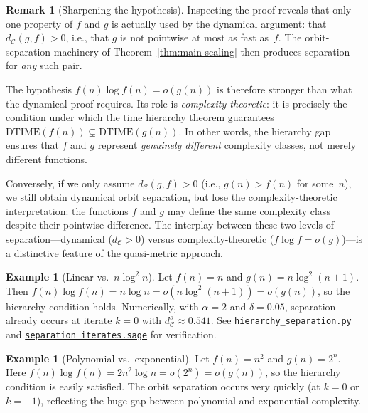 \documentclass[11pt,a4paper]{article}
\newcommand{\repourl}{https://github.com/guydev42/expansive-homeomorphisms-complexity-qmetric}
\theoremstyle{plain}
\theoremstyle{definition}
\newtheorem{exampleinner}[theoreminner]{Example}
\newtheorem{remarkinner}[theoreminner]{Remark}
\newenvironment{example}[1][]{\begin{exampleinner}[#1]}{\end{exampleinner}}
\newenvironment{remark}[1][]{\begin{remarkinner}[#1]}{\end{remarkinner}}
\newcommand{\C}{\mathcal{C}}
\begin{document}
\begin{remark}[Sharpening the hypothesis]\label{rem:hierarchy-sharp}
Inspecting the proof reveals that only one property of $f$ and $g$
is actually used by the dynamical argument: that $d_\C(g,f)>0$,
i.e., that $g$ is not pointwise at most as fast as~$f$.  The
orbit-separation machinery of Theorem~\ref{thm:main-scaling}
then produces separation for \emph{any} such pair.

The hypothesis $f(n)\log f(n)=o(g(n))$ is therefore stronger than
what the dynamical proof requires.  Its role is
\emph{complexity-theoretic}: it is precisely the condition under
which the time hierarchy theorem guarantees
$\mathrm{DTIME}(f(n))\subsetneq\mathrm{DTIME}(g(n))$.  In other
words, the hierarchy gap ensures that $f$ and $g$ represent
\emph{genuinely different} complexity classes, not merely different
functions.

Conversely, if we only assume $d_\C(g,f)>0$ (i.e., $g(n)>f(n)$ for
some~$n$), we still obtain dynamical orbit separation, but lose the
complexity-theoretic interpretation: the functions $f$ and $g$ may
define the same complexity class despite their pointwise difference.
The interplay between these two levels of separation---dynamical
($d_\C>0$) versus complexity-theoretic ($f\log f=o(g)$)---is a
distinctive feature of the quasi-metric approach.
\end{remark}

\begin{example}[Linear vs.\ $n\log^2 n$]\label{ex:hier-nlogn}
Let $f(n)=n$ and $g(n)=n\log^2(n+1)$.  Then
$f(n)\log f(n)=n\log n=o(n\log^2(n+1))=o(g(n))$, so the hierarchy
condition holds.  Numerically, with $\alpha=2$ and $\delta=0.05$,
separation already occurs at iterate $k=0$ with
$d_\C^s\approx 0.541$.  See
\href{\repourl/blob/main/code/python/hierarchy_separation.py}{\texttt{hierarchy\_separation.py}} and
\href{\repourl/blob/main/code/sagemath/separation_iterates.sage}{\texttt{separation\_iterates.sage}}
for verification.
\end{example}

\begin{example}[Polynomial vs.\ exponential]\label{ex:hier-poly-exp}
Let $f(n)=n^2$ and $g(n)=2^n$.  Here $f(n)\log f(n)=2n^2\log n
=o(2^n)=o(g(n))$, so the hierarchy condition is easily satisfied.
The orbit separation occurs very quickly (at $k=0$ or $k=-1$),
reflecting the huge gap between polynomial and exponential complexity.
\end{example}
\end{document}
